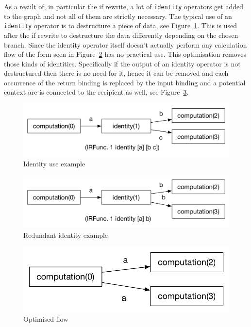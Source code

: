 As a result of, in particular the if rewrite, a lot of \texttt{identity} operators get added to the graph and not all of them are strictly necessary.
The typical use of an \texttt{identity} operator is to destructure a piece of data, see Figure~\ref{fig:identity-example}.
This is used after the if rewrite to destructure the data differently  depending on the chosen branch.
Since the identity operator itself doesn't actually perform any calculation flow of the form seen in Figure~\ref{fig:redundant-identity-example} has no practical use.
This optimisation removes those kinds of identities.
Specifically if the output of an identity operator is not destructured then there is no need for it, hence it can be removed and each occurrence of the return binding is replaced by the input binding and a potential context arc is connected to the recipient as well, see Figure~\ref{fig:redundant-identity-example-rewritten}.

\begin{figure}
    \includegraphics[width=\linewidth]{../Figures/identity-example}
    \caption{Identity use example}
    \label{fig:identity-example}
\end{figure}

\begin{figure}
    \includegraphics[width=\linewidth]{../Figures/redundant-identity-example}
    \caption{Redundant identity example}
    \label{fig:redundant-identity-example}
\end{figure}

\begin{figure}
    \includegraphics[width=\linewidth]{../Figures/redundant-identity-example-rewritten}
    \caption{Optimised flow}
    \label{fig:redundant-identity-example-rewritten}
\end{figure}

